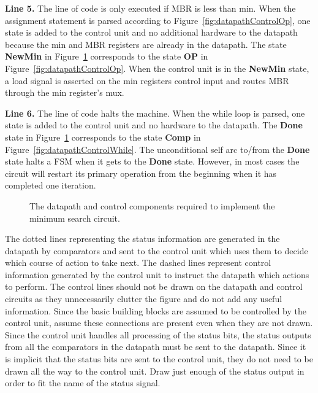 \textbf{ Line 5.}  The line of code is only executed if MBR is less than min.  
When the assignment statement is parsed according to Figure~\ref{fig:datapathControlOp},
one state is added to the control unit and no additional hardware
to the datapath because the min and MBR registers are already in the datapath.
The state \textbf{ NewMin} in Figure~\ref{fig:datapathControlMinSearch} corresponds to the state
\textbf{ OP} in Figure~\ref{fig:datapathControlOp}.  When the control unit is in the \textbf{ NewMin}
state, a load signal is asserted on the min registers control input 
and routes MBR through the min register's mux.

\textbf{ Line 6.}  The line of code halts the machine.  When the while loop is parsed,
one state is added to the control unit and no hardware to the 
datapath.  The \textbf{ Done} state in Figure~\ref{fig:datapathControlMinSearch} corresponds to 
the state \textbf{ Comp} in Figure~\ref{fig:datapathControlWhile}.  The unconditional self arc
to/from the \textbf{ Done} state halts a FSM when it gets to the \textbf{ Done}
state.  However, in most cases the circuit will restart its primary 
operation from the beginning when it has completed one iteration. 

\begin{figure}[ht]
\caption{The datapath and control components required to implement
the minimum search circuit.}
\label{fig:datapathControlMinSearch}
\end{figure}

The dotted lines representing the status information are generated in the 
datapath by comparators and sent to the control unit which uses them to 
decide which course of action to take next.  The dashed lines 
represent control information generated by the control unit to instruct
the datapath which actions to perform.  The control lines should not be 
drawn on the datapath and control circuits as they unnecessarily clutter 
the figure and do not add any useful information.  Since the basic 
building blocks are assumed to be controlled by the control unit, 
assume these connections are present even when they are not drawn.
Since the control unit handles all processing of the status bits,
the status outputs from all the comparators in the datapath must
be sent to the datapath.  Since it is implicit that the status bits
are sent to the control unit, they do not need to be drawn all the
way to the control unit.  Draw just enough of the status output 
in order to fit the name of the status signal.  

